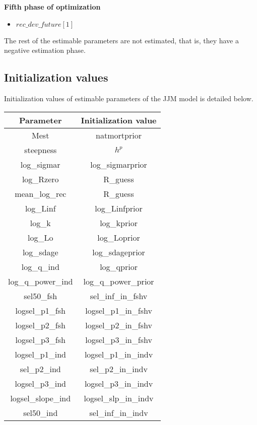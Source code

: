 \documentclass{article}
\begin{document}
\textbf{Fifth phase of optimization}
\begin{itemize}
    \item $rec\_dev\_future[1]$
\end{itemize}

The rest of the estimable parameters are not estimated, that is, they have a negative estimation phase.

\subsection{Initialization values}
Initialization values of estimable parameters of the JJM model is detailed below.

\begin{tabular}{| c | c |}
\hline
    Parameter & Initialization value \\ \hline  \hline
    Mest & natmortprior \\ \hline
     steepness & $h^p$ \\ \hline
     log\_sigmar & log\_sigmarprior \\ \hline
     log\_Rzero &    R\_guess\\ \hline
     mean\_log\_rec 
 & R\_guess\\ \hline
 log\_Linf  &  log\_Linfprior\\ \hline
  log\_k &       log\_kprior\\ \hline
  log\_Lo &      log\_Loprior\\ \hline
  log\_sdage &  log\_sdageprior\\ \hline
   log\_q\_ind & log\_qprior\\ \hline
  log\_q\_power\_ind & log\_q\_power\_prior\\ \hline
  sel50\_fsh & sel\_inf\_in\_fshv\\ \hline
  logsel\_p1\_fsh &   logsel\_p1\_in\_fshv \\ \hline
  logsel\_p2\_fsh &   logsel\_p2\_in\_fshv\\ \hline
  logsel\_p3\_fsh &  logsel\_p3\_in\_fshv \\ \hline
  logsel\_p1\_ind &   logsel\_p1\_in\_indv \\ \hline
  sel\_p2\_ind  &       sel\_p2\_in\_indv \\ \hline
  logsel\_p3\_ind &   logsel\_p3\_in\_indv\\ \hline
  logsel\_slope\_ind & logsel\_slp\_in\_indv \\ \hline
  sel50\_ind & sel\_inf\_in\_indv \\ \hline
\end{tabular}
\end{document}
